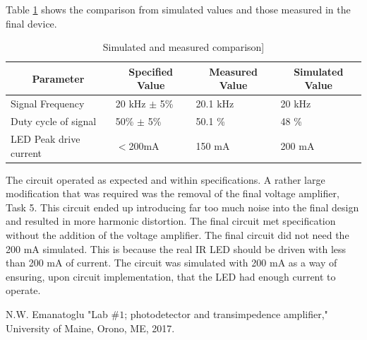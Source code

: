 \documentclass{article}
\begin{document}
Table \ref{tab:simcompare} shows the comparison from simulated values and those measured in the final device.
\begin{table}[H]
	\centering
	\caption{Simulated and measured comparison]}
	\label{tab:simcompare}
	\begin{tabular}{|l|l|l|l|}
		\hline
		\multicolumn{1}{|c|}{\textbf{Parameter}} & \multicolumn{1}{c|}{\textbf{Specified Value}} & \multicolumn{1}{c|}{\textbf{Measured Value}} & \multicolumn{1}{c|}{\textbf{Simulated Value}} \\ \hline
		Signal Frequency                         & 20 kHz $\pm$ 5\%                              & 20.1 kHz                                     & 20 kHz                                        \\ \hline
		Duty cycle of signal                     & 50\% $\pm$ 5\%                                & 50.1 \%                                      & 48 \%                                         \\ \hline
		LED Peak drive current                   & $<$200mA                                      & 150 mA                                       & 200 mA                                        \\ \hline
	\end{tabular}
\end{table}

The circuit operated as expected and within specifications. A rather large modification that was required was the removal of the final voltage amplifier, Task 5. This circuit ended up introducing far too much noise into the final design and resulted in more harmonic distortion. The final circuit met specification without the addition of the voltage amplifier. The final circuit did not need the 200 mA simulated. This is because the real IR LED should be driven with less than 200 mA of current. The circuit was simulated with 200 mA as a way of ensuring, upon circuit implementation, that the LED had enough current to operate.
  
 
    
    \newpage
\clearpage

\appendix

\begin{thebibliography}{00}



 N.W. Emanatoglu "Lab $\#1$; photodetector and transimpedence amplifier," University of Maine, Orono, ME, 2017.
\newline

\newpage


\end{thebibliography}
\end{document}

